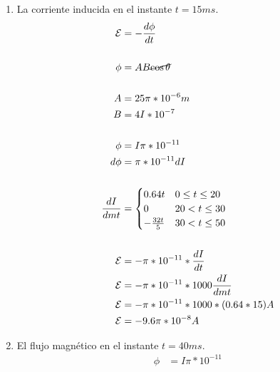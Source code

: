 \documentclass[10pt, twoside]{article}
\begin{document}
\begin{enumerate}
\begin{figure}[H]
		\end{figure}

		\begin{enumerate}
			\item La corriente inducida en el instante $t=15ms$.
				\begin{align*}
					\mathcal{E} &= - \frac{d\phi}{dt} \\
					\\
					\phi &= AB\cancel{\cos{\theta}}\\
					\\
					A &= 25\pi*10^{-6}m \\
					B &= 4I*10^{-7}\\
					\\
					\phi  & = I\pi*10^{-11}\\
					d\phi & = \pi*10^{-11}dI\\
					\\
					\frac{dI}{dmt} &=
					\begin{cases}
						0.64t           & 0 \leq t \leq 20\\
						0               & 20 < t \leq 30\\
						- \frac{32t}{5} & 30 < t \leq 50
					\end{cases}\\
					\\
						\mathcal{E} &= -\pi*10^{-11} * \frac{dI}{dt}\\
						\mathcal{E} &= -\pi*10^{-11} * 1000\frac{dI}{dmt}\\
						\mathcal{E} &= -\pi*10^{-11} * 1000*(0.64*15)A\\
						\mathcal{E} &= - 9.6\pi*10^{-8}A
				\end{align*}
			\item El flujo magnético en el instante $t=40ms$.
				\begin{align*}
					\phi &= I\pi*10^{-11}\\

\end{align*}
\end{enumerate}
\end{enumerate}
\end{document}
